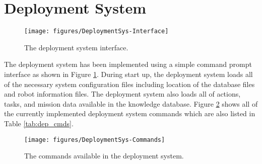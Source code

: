 
  \section{Deployment System}\label{sec:imp_deploy}

    \begin{figure}%
    \centerline{
        \texttt{[image: figures/DeploymentSys-Interface]}}
    \caption{The deployment system interface.}
    \label{fig:dep_interface}
    \end{figure}
    The deployment system has been implemented using a simple command prompt 
      interface as shown in Figure \ref{fig:dep_interface}.
    During start up, the deployment system loads all of the necessary system 
      configuration files including location of the database files and
      robot information files.
    The deployment system also loads all of actions, tasks, 
      and mission data available in the knowledge database.
    Figure \ref{fig:dep_commands} shows all of the currently implemented
      deployment system commands which are also listed in Table 
      \ref{tab:dep_cmds}.
    \begin{figure}%
    \centerline{
        \texttt{[image: figures/DeploymentSys-Commands]}}
    \caption{The commands available in the deployment system.}
    \label{fig:dep_commands}
    \end{figure}
 
